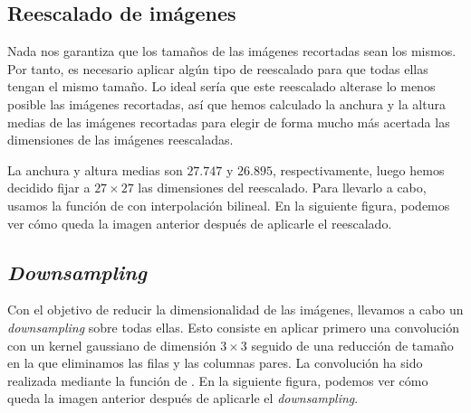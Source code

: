 \documentclass[a4]{article}
\begin{document}
\subsection{Reescalado de imágenes}

Nada nos garantiza que los tamaños de las imágenes recortadas sean los mismos. Por tanto, es necesario aplicar algún tipo de reescalado para que todas ellas tengan el mismo tamaño. Lo ideal sería que este reescalado alterase lo menos posible las imágenes recortadas, así que hemos calculado la anchura y la altura medias de las imágenes recortadas para elegir de forma mucho más acertada las dimensiones de las imágenes reescaladas. 

La anchura y altura medias son $27.747$ y $26.895$, respectivamente, luego hemos decidido fijar a $27 \times 27$ las dimensiones del reescalado. Para llevarlo a cabo, usamos la función  de  con interpolación bilineal. En la siguiente figura, podemos ver cómo queda la imagen anterior después de aplicarle el reescalado.

\begin{figure}[H]
    \centering
	\label{fig:prep_reescalado}
\end{figure}


\subsection{\textit{Downsampling}}

Con el objetivo de reducir la dimensionalidad de las imágenes, llevamos a cabo un \textit{downsampling} sobre todas ellas. Esto consiste en aplicar primero una convolución con un kernel gaussiano de dimensión $3 \times 3$ seguido de una reducción de tamaño en la que eliminamos las filas y las columnas pares. La convolución ha sido realizada mediante la función  de . En la siguiente figura, podemos ver cómo queda la imagen anterior después de aplicarle el \textit{downsampling}.
\end{document}
